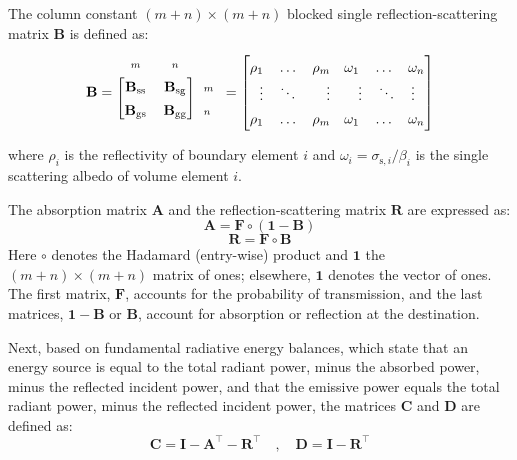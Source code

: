 \documentclass[preprint,1p,times]{elsarticle}
\theoremstyle{plain}
\theoremstyle{definition}
\theoremstyle{remark}
\begin{document}
The column constant $(m+n)\times(m+n)$ blocked single reflection-scattering matrix $\mathbf{B}$ is defined as:
\begin{equation}
	\renewcommand{\arraystretch}{1.4}
	\mathbf{B} =
	\begin{blockarray}{ccl}
	\scriptstyle m & \scriptstyle n & \\
	\begin{block}{[cc]l}
	\mathbf{B}_\mathrm{ss} & \mathbf{B}_\mathrm{sg} & \scriptstyle m \\
	\mathbf{B}_\mathrm{gs} & \mathbf{B}_\mathrm{gg} & \scriptstyle n \\
	\end{block}
	\end{blockarray}
	=
	\begin{bmatrix}
	\rho_1 \quad \dots \quad \rho_m \quad \omega_1  \quad \dots \quad \omega_n \\
	\vdots \quad \ddots \quad\quad \vdots \quad\quad \vdots \quad \ddots \quad \vdots \\
	\rho_1 \quad \dots  \quad \rho_m \quad \omega_1  \quad \dots  \quad \omega_n
	\end{bmatrix}
\end{equation}
where $\rho_i$ is the reflectivity of boundary element $i$ and $\omega_i=\sigma_{\mathrm{s},i}/\beta_i$ is the single scattering albedo of volume element $i$. 

The absorption matrix $\mathbf{A}$ and the reflection-scattering matrix $\mathbf{R}$ are expressed as:
\begin{equation}
	\mathbf{A} = \mathbf{F} \circ (\mathbf{1} - \mathbf{B})\label{eq:A}
\end{equation}
\begin{equation}
	\mathbf{R} = \mathbf{F} \circ \mathbf{B}
	\label{eq:R}
\end{equation}
Here $\circ$ denotes the Hadamard (entry-wise) product and $\mathbf{1}$ the $(m+n)\times(m+n)$ matrix of ones; elsewhere, $\mathbf{1}$ denotes the vector of ones. The first matrix, $\mathbf{F}$, accounts for the probability of transmission, and the last matrices, $\mathbf{1} - \mathbf{B}$ or $\mathbf{B}$, account for absorption or reflection at the destination.

Next, based on fundamental radiative energy balances, which state that an energy source is equal to the total radiant power, minus the absorbed power, minus the reflected incident power, and that the emissive power equals the total radiant power, minus the reflected incident power, the matrices $\mathbf{C}$ and $\mathbf{D}$ are defined as:
\begin{equation}
	\mathbf{C} = \mathbf{I} - \mathbf{A}^\top - \mathbf{R}^\top
	\quad , \quad
	\mathbf{D} = \mathbf{I} - \mathbf{R}^\top
	\label{eq:C_and_D}
\end{equation}
\end{document}
